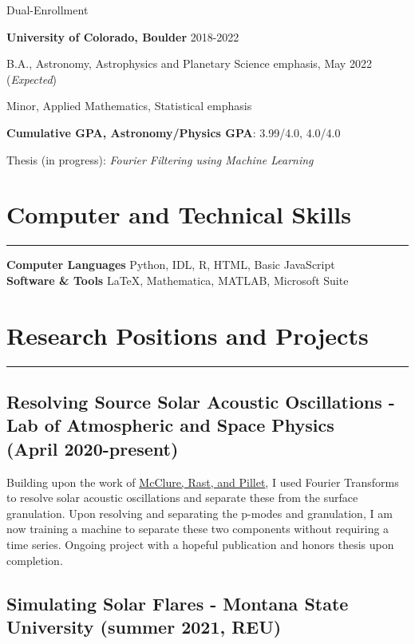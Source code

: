 \documentclass{article}
\newcommand{\divider}{\vskip-2pt\hrule\vskip4pt}
\begin{document}
\quad Dual-Enrollment

\textbf{University of Colorado, Boulder} 2018-2022

\quad B.A., Astronomy, Astrophysics and Planetary Science emphasis, May 2022 (\textit{Expected})

\quad \quad Minor, Applied Mathematics, Statistical emphasis

\quad \textbf{Cumulative GPA, Astronomy/Physics GPA}: 3.99/4.0, 4.0/4.0



\quad Thesis (in progress): \textit{Fourier Filtering using Machine Learning}

\section{Computer and Technical Skills}
\divider

{\bf Computer Languages} \hspace{10pt} { Python, IDL, R, HTML, Basic JavaScript}\\
{\bf Software \& Tools} \hspace{30pt} { \LaTeX, Mathematica, MATLAB, Microsoft Suite}\\

\section{Research Positions and Projects}
\divider

\subsection{Resolving Source Solar Acoustic Oscillations - Lab of Atmospheric and Space Physics \\ (April 2020-present)}

Building upon the work of \href{https://arxiv.org/abs/1811.08944}{McClure, Rast, and Pillet}, I used Fourier Transforms to resolve solar acoustic oscillations and separate these from the surface granulation. Upon resolving and separating the p-modes and granulation, I am now training a machine to separate these two components without requiring a time series. Ongoing project with a hopeful publication and honors thesis upon completion. 

\subsection{Simulating Solar Flares - Montana State University (summer 2021, REU)}
\end{document}
